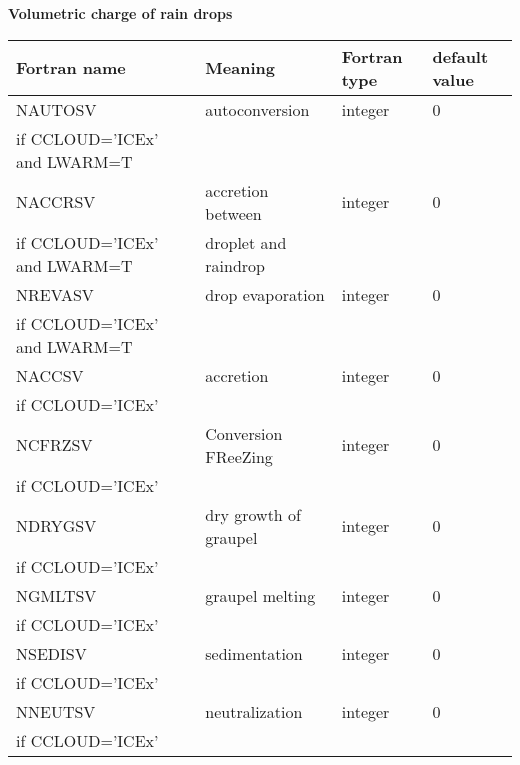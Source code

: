 \textbf{Volumetric charge of rain drops}
\begin{longtable} {|p{}|p{}|>{\centering}p{}|p{}<{\centering}|}
\hline
Fortran name & Meaning & Fortran type & default value \\
\hline \hline
\endhead
NAUTOSV & autoconversion & integer & 0 \\ \nopagebreak
if CCLOUD='ICEx' and LWARM=T &&& \\\hline

NACCRSV & accretion between  & integer & 0 \\ \nopagebreak
if CCLOUD='ICEx' and LWARM=T &droplet and raindrop&& \\\hline

NREVASV & drop evaporation & integer & 0 \\ \nopagebreak
if CCLOUD='ICEx' and LWARM=T &&& \\\hline

NACCSV & accretion & integer & 0 \\ \nopagebreak
if CCLOUD='ICEx' &&& \\\hline

NCFRZSV & Conversion FReeZing & integer & 0 \\ \nopagebreak
if CCLOUD='ICEx' &&& \\\hline

NDRYGSV & dry growth of graupel & integer & 0 \\ \nopagebreak
if CCLOUD='ICEx' &&& \\\hline

NGMLTSV & graupel melting& integer & 0 \\ \nopagebreak
if CCLOUD='ICEx' &&& \\\hline

NSEDISV & sedimentation& integer & 0 \\ \nopagebreak
if CCLOUD='ICEx' &&& \\\hline

NNEUTSV & neutralization & integer & 0 \\ \nopagebreak
if CCLOUD='ICEx' &&& \\\hline
\end{longtable}

